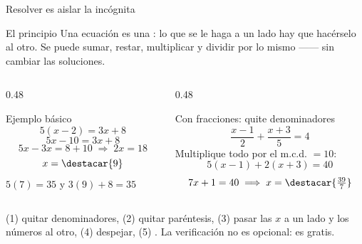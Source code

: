 \documentclass[aspectratio=169,10pt]{beamer}
\begin{document}
\begin{frame}{Resolver es aislar la incógnita}
  \scriptsize
  \begin{block}{El principio}
    \tiny
    Una ecuación es una : lo que se le haga a un lado hay que
    hacérselo al otro. Se puede sumar, restar, multiplicar y dividir por lo
    mismo —— sin cambiar las soluciones.
  \end{block}

  \vspace{0.04cm}
  \begin{columns}[T,onlytextwidth]
    \begin{column}{0.48\textwidth}
      \begin{exampleblock}{Ejemplo básico}
        \tiny
        \[ 5(x-2) = 3x+8 \]
        \[ 5x-10 = 3x+8 \]
        \[ 5x-3x = 8+10 \;\Longrightarrow\; 2x = 18 \]
        \[ x = \destacar{9} \]
         $5(7)=35$ y $3(9)+8=35$ \checkmark
      \end{exampleblock}
    \end{column}
    \begin{column}{0.48\textwidth}
      \begin{exampleblock}{Con fracciones: quite denominadores}
        \tiny
        \[ \frac{x-1}{2}+\frac{x+3}{5} = 4 \]
        Multiplique todo por el m.c.d. $=10$:
        \[ 5(x-1)+2(x+3) = 40 \]
        \[ 7x+1 = 40 \;\Longrightarrow\; x = \destacar{\tfrac{39}{7}} \]
      \end{exampleblock}
    \end{column}
  \end{columns}

  \vspace{0.0cm}
  {\tiny\color{uniGris} 
  (1) quitar denominadores, (2) quitar paréntesis, (3) pasar las $x$ a un lado
  y los números al otro, (4) despejar, (5) . La verificación
  no es opcional: es gratis.}
\end{frame}
\end{document}
